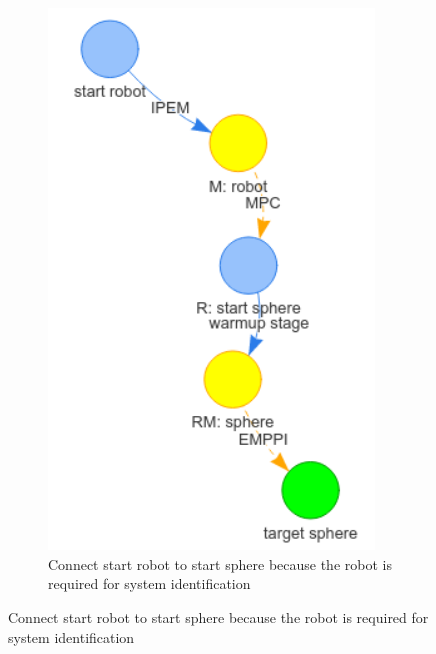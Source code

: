 \begin{figure}[H]
\begin{subfigure}[b]{0.49\textwidth}
         \includegraphics[width=0.95\textwidth]{figures/HGraph_example/3.png}
         \caption{Connect start robot to start sphere because the robot is required for system identification}
     \end{subfigure}
     

\end{figure}
